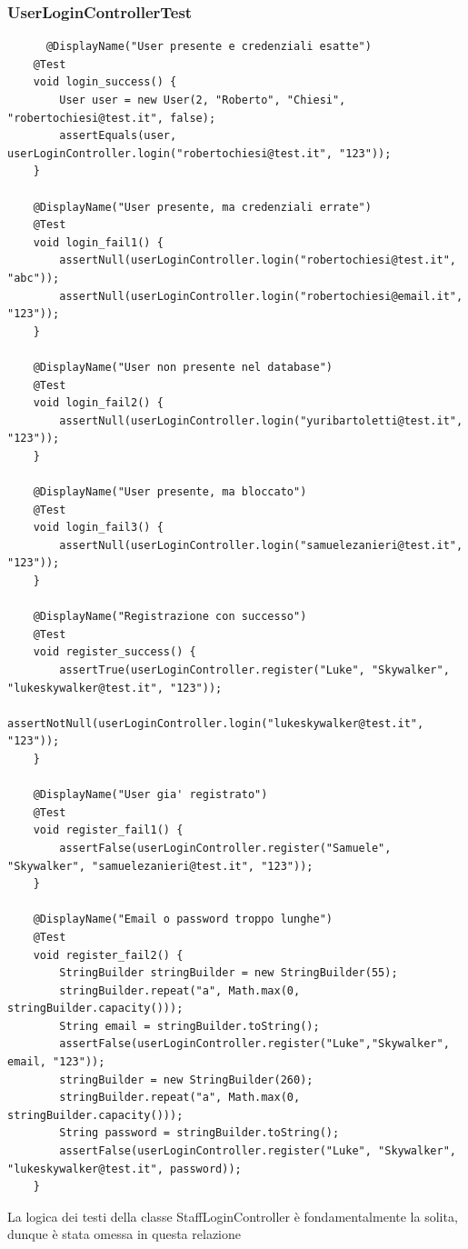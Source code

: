 \documentclass[a4paper, 11pt]{article}
\begin{document}
	\subsubsection{UserLoginControllerTest}
	\begin{lstlisting}
      @DisplayName("User presente e credenziali esatte")
    @Test
    void login_success() {
        User user = new User(2, "Roberto", "Chiesi", "robertochiesi@test.it", false);
        assertEquals(user, userLoginController.login("robertochiesi@test.it", "123"));
    }

    @DisplayName("User presente, ma credenziali errate")
    @Test
    void login_fail1() {
        assertNull(userLoginController.login("robertochiesi@test.it", "abc"));
        assertNull(userLoginController.login("robertochiesi@email.it", "123"));
    }

    @DisplayName("User non presente nel database")
    @Test
    void login_fail2() {
        assertNull(userLoginController.login("yuribartoletti@test.it", "123"));
    }

    @DisplayName("User presente, ma bloccato")
    @Test
    void login_fail3() {
        assertNull(userLoginController.login("samuelezanieri@test.it", "123"));
    }

    @DisplayName("Registrazione con successo")
    @Test
    void register_success() {
        assertTrue(userLoginController.register("Luke", "Skywalker", "lukeskywalker@test.it", "123"));
        assertNotNull(userLoginController.login("lukeskywalker@test.it", "123"));
    }

    @DisplayName("User gia' registrato")
    @Test
    void register_fail1() {
        assertFalse(userLoginController.register("Samuele", "Skywalker", "samuelezanieri@test.it", "123"));
    }

    @DisplayName("Email o password troppo lunghe")
    @Test
    void register_fail2() {
        StringBuilder stringBuilder = new StringBuilder(55);
        stringBuilder.repeat("a", Math.max(0, stringBuilder.capacity()));
        String email = stringBuilder.toString();
        assertFalse(userLoginController.register("Luke","Skywalker", email, "123"));
        stringBuilder = new StringBuilder(260);
        stringBuilder.repeat("a", Math.max(0, stringBuilder.capacity()));
        String password = stringBuilder.toString();
        assertFalse(userLoginController.register("Luke", "Skywalker", "lukeskywalker@test.it", password));
    }
	\end{lstlisting}
	La logica dei testi della classe StaffLoginController è fondamentalmente la solita, dunque è stata omessa in questa relazione
\end{document}
